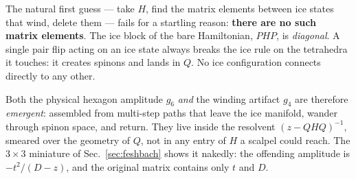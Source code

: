 \documentclass[11pt,a4paper]{article}
\newcommand{\gfour}{g_4}
\newcommand{\gsix}{g_6}
\begin{document}
The natural first guess --- take $H$, find the matrix elements between ice
states that wind, delete them --- fails for a startling reason:
\textbf{there are no such matrix elements}.  The ice block of the bare
Hamiltonian, $PHP$, is \emph{diagonal}.  A single pair flip acting on an ice
state always breaks the ice rule on the tetrahedra it touches: it creates
spinons and lands in $Q$.  No ice configuration connects directly to any
other.

Both the physical hexagon amplitude $\gsix$ \emph{and} the winding artifact
$\gfour$ are therefore \emph{emergent}: assembled from multi-step paths that
leave the ice manifold, wander through spinon space, and return.  They live
inside the resolvent $(z-QHQ)^{-1}$, smeared over the geometry of $Q$, not
in any entry of $H$ a scalpel could reach.  The $3\times3$ miniature of
Sec.~\ref{sec:feshbach} shows it nakedly: the offending amplitude is
$-t^2/(D-z)$, and the original matrix contains only $t$ and $D$.
\end{document}
